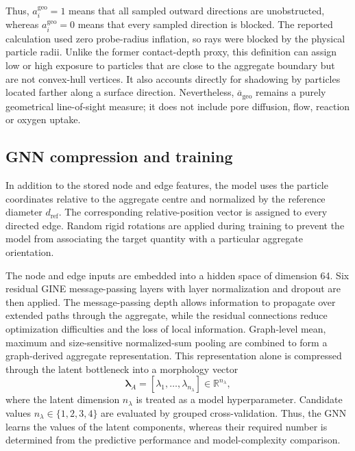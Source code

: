 \documentclass[12pt,a4paper]{article}
\begin{document}
Thus, $a_i^{\mathrm{geo}}=1$ means that all sampled outward directions are
unobstructed, whereas $a_i^{\mathrm{geo}}=0$ means that every sampled direction
is blocked. The reported calculation used zero probe-radius inflation, so rays
were blocked by the physical particle radii. Unlike the former contact-depth
proxy, this definition can assign low or high exposure to particles that are
close to the aggregate boundary but are not convex-hull vertices. It also
accounts directly for shadowing by particles located farther along a surface
direction. Nevertheless, $\overline{a}_{\mathrm{geo}}$ remains a purely
geometrical line-of-sight measure; it does not include pore diffusion, flow,
reaction or oxygen uptake.

\subsection{GNN compression and training}

In addition to the stored node and edge features, the model uses the particle
coordinates relative to the aggregate centre and normalized by the reference
diameter $d_{\mathrm{ref}}$. The corresponding relative-position vector is
assigned to every directed edge. Random rigid rotations are applied during
training to prevent the model from associating the target quantity with a
particular aggregate orientation.

The node and edge inputs are embedded into a hidden space of dimension 64.
Six residual GINE message-passing layers with layer normalization and dropout
are then applied. The message-passing depth allows information to propagate
over extended paths through the aggregate, while the residual connections
reduce optimization difficulties and the loss of local information. Graph-level
mean, maximum and size-sensitive normalized-sum pooling are combined to form a
graph-derived aggregate representation. This representation alone is
compressed through the latent bottleneck into a morphology vector
\begin{equation}
	\boldsymbol{\lambda}_A =
	\left[\lambda_1,\ldots,\lambda_{n_\lambda}\right]
	\in \mathbb{R}^{n_\lambda},
\end{equation}
where the latent dimension $n_\lambda$ is treated as a model hyperparameter.
Candidate values $n_\lambda\in\{1,2,3,4\}$ are evaluated by grouped
cross-validation. Thus, the GNN learns the values of the latent components,
whereas their required number is determined from the predictive performance
and model-complexity comparison.
\end{document}
